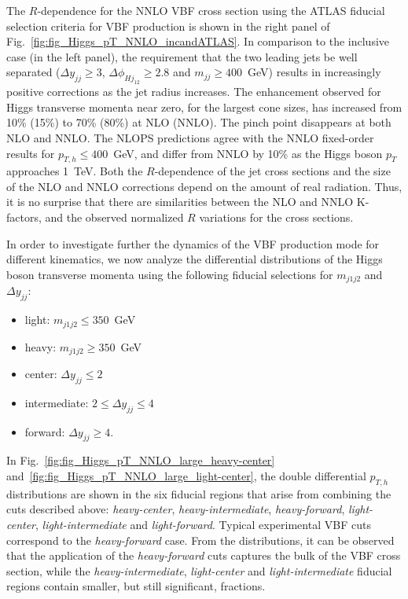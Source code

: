 \documentclass[10pt,prd,fleqn,superscriptaddress,notitlepage,nofootinbib,preprintnumbers,nobalancelastpage]{revtex4-1}
\newcommand{\VBF}{VBF\xspace}
\begin{document}
The $R$-dependence for the NNLO \VBF cross section using the ATLAS fiducial selection criteria for \VBF production is shown in the right panel of Fig.~\ref{fig:fig_Higgs_pT_NNLO_incandATLAS}. In comparison to the inclusive case (in the left panel), the requirement that the two leading jets be well separated ($\Delta y_{jj} \ge 3$, $\Delta \phi_{Hj_{12}} \geq 2.8 $ and $m_{jj} \geq 400$~GeV) results in increasingly positive corrections as the  jet radius increases.
The enhancement observed  for Higgs transverse momenta near zero, for the largest cone sizes, has increased from 10\% (15\%) to 70\% (80\%) at NLO (NNLO). The  pinch point disappears at both NLO and NNLO.
The NLOPS predictions agree with the NNLO fixed-order results for $p_{T,h}\le 400$~GeV, and differ  from NNLO by 10\% as the Higgs boson $p_T$ approaches 1~TeV. Both the $R$-dependence of the jet cross sections and the size of the NLO and NNLO corrections depend on the amount of real radiation. Thus, it is no surprise that there are similarities between the NLO and NNLO K-factors, and the observed normalized $R$ variations for the cross sections.



In order to investigate further the dynamics of the \VBF production mode for different kinematics, we now analyze the differential distributions of the Higgs boson transverse momenta using the following fiducial selections for $m_{j1j2}$ and $\Delta y_{jj}$:
\begin{itemize}
    \item light: $m_{j1j2} \le 350$~GeV
    \item heavy: $m_{j1j2} \ge 350$~GeV
    \item center: $\Delta y_{jj} \le 2$
    \item intermediate: $2 \le \Delta y_{jj} \le 4$
    \item forward: $\Delta y_{jj} \ge 4$.
\end{itemize}
In Fig.~\ref{fig:fig_Higgs_pT_NNLO_large_heavy-center} and~\ref{fig:fig_Higgs_pT_NNLO_large_light-center}, the double differential $p_{T,h}$ distributions are shown in the six fiducial regions that arise from combining the  cuts described above: \textit{heavy-center}, \textit{heavy-intermediate}, \textit{heavy-forward}, \textit{light-center}, \textit{light-intermediate} and \textit{light-forward}. Typical experimental \VBF cuts correspond to the \textit{heavy-forward} case. From the distributions, it can be observed that the application of the  \textit{heavy-forward} cuts captures the bulk of the \VBF cross section, while the \textit{heavy-intermediate}, \textit{light-center} and \textit{light-intermediate} fiducial regions contain smaller, but still significant, fractions.
\end{document}
